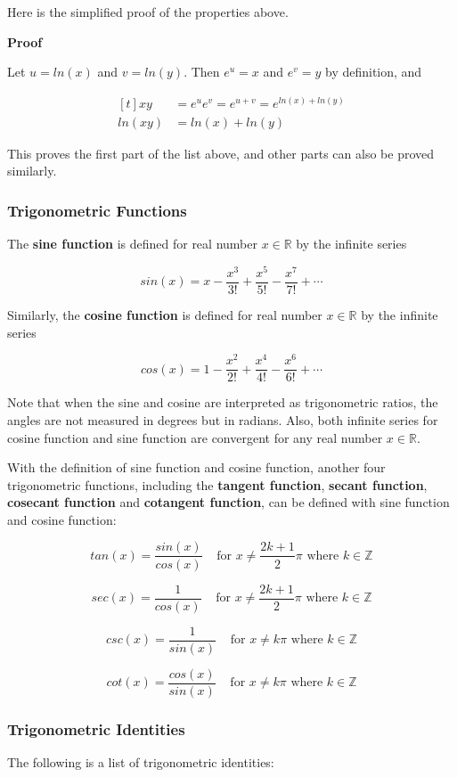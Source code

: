 \documentclass[a4paper,12pt]{article}
\newcommand{\s}{\vspace{1mm}}
\newcommand{\n}{\vspace{3mm}}
\newcommand{\R}{\mathbb{R}}
\newcommand{\Z}{\mathbb{Z}}
\newenvironment{block}[4][Block]{ %
\begin{list}{}{
  \setlength{\leftmargin}{0mm}
  \setlength{\rightmargin}{0mm}
  \setlength{\topsep}{0mm}
  \setlength{\partopsep}{0mm}
  \parsep\parskip
  \setlength{\itemsep}{-\parsep}
  }
  \needspace{\baselineskip}
  \item \textbf{#2 #3} \hspace{1mm} #4
  \vspace{1mm}
  \item
  }
{
\end{list}
}
\begin{document}
Here is the simplified proof of the properties above.\n

\begin{block}{Proof}{}{}
  Let $u=ln(x)$ and $v=ln(y)$. Then $e^{u}=x$ and $e^{v}=y$ by definition, and

  $$\begin{aligned}[t]
    xy&=e^{u}e^{v}=e^{u+v}=e^{ln(x)+ln(y)}\\
    ln(xy)&=ln(x)+ln(y)
  \end{aligned}$$\s

  This proves the first part of the list above, and other parts can also be proved similarly.
\end{block}

\subsubsection{Trigonometric Functions}
The \textbf{sine function} is defined for real number $x\in \R$ by the infinite series

$$sin(x)=x-\frac{x^{3}}{3!}+\frac{x^{5}}{5!}-\frac{x^{7}}{7!}+\cdots$$\s

Similarly, the \textbf{cosine function} is defined for real number $x\in \R$ by the infinite series

$$cos(x)=1-\frac{x^{2}}{2!}+\frac{x^{4}}{4!}-\frac{x^{6}}{6!}+\cdots$$\s

Note that when the sine and cosine are interpreted as trigonometric ratios, the angles are not measured in degrees but in radians. Also, both infinite series for cosine function and sine function are convergent for any real number $x\in \R$.\n

With the definition of sine function and cosine function, another four trigonometric functions, including the \textbf{tangent function}, \textbf{secant function}, \textbf{cosecant function} and \textbf{cotangent function}, can be defined with sine function and cosine function:

$$tan(x)=\frac{sin(x)}{cos(x)}\;\;\;\;\text{for }x\neq \frac{2k+1}{2}\pi \text{ where }k\in \Z$$\s

$$sec(x)=\frac{1}{cos(x)}\;\;\;\;\text{for }x\neq \frac{2k+1}{2}\pi \text{ where }k\in \Z$$\s

$$csc(x)=\frac{1}{sin(x)}\;\;\;\;\text{for }x\neq k\pi \text{ where }k\in \Z$$\s

$$cot(x)=\frac{cos(x)}{sin(x)}\;\;\;\;\text{for }x\neq k\pi \text{ where }k\in \Z$$\s

\subsubsection{Trigonometric Identities}
The following is a list of trigonometric identities:
\end{document}
